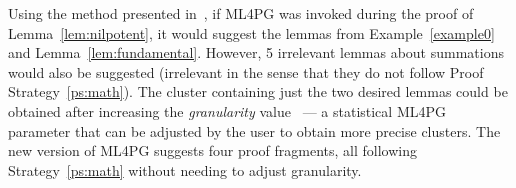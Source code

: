 %         
%  		



Using the method presented in~\cite{KHG13}, if ML4PG was invoked during the proof of Lemma~\ref{lem:nilpotent}, it would suggest the lemmas from Example~\ref{example0} and 
Lemma~\ref{lem:fundamental}. However, 5 irrelevant lemmas 
 about summations would also be suggested (irrelevant in the sense that they do not follow Proof Strategy~\ref{ps:math}). The cluster containing just the two desired lemmas could be obtained after
increasing the \emph{granularity} value~\cite{KHG13} --- a statistical ML4PG parameter that can be adjusted by the user to obtain more precise clusters. The new version of ML4PG suggests four proof fragments, all following Strategy~\ref{ps:math} without needing to adjust granularity.

